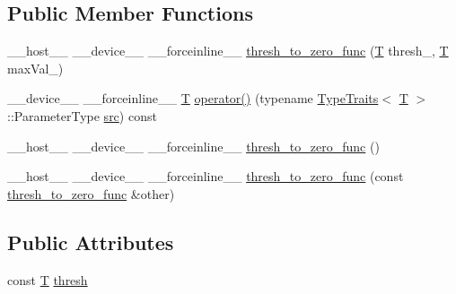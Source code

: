 \subsection*{Public Member Functions}
\begin{DoxyCompactItemize}
\item 
\-\_\-\-\_\-host\-\_\-\-\_\- \-\_\-\-\_\-device\-\_\-\-\_\- \-\_\-\-\_\-forceinline\-\_\-\-\_\- \hyperlink{structcv_1_1gpu_1_1device_1_1thresh__to__zero__func_aba225cc12669790c436d10f9c2ae39e4}{thresh\-\_\-to\-\_\-zero\-\_\-func} (\hyperlink{calib3d_8hpp_a3efb9551a871ddd0463079a808916717}{T} thresh\-\_\-, \hyperlink{calib3d_8hpp_a3efb9551a871ddd0463079a808916717}{T} max\-Val\-\_)
\item 
\-\_\-\-\_\-device\-\_\-\-\_\- \-\_\-\-\_\-forceinline\-\_\-\-\_\- \hyperlink{calib3d_8hpp_a3efb9551a871ddd0463079a808916717}{T} \hyperlink{structcv_1_1gpu_1_1device_1_1thresh__to__zero__func_a1f7f3bb5c1ef287751888031e6d613cd}{operator()} (typename \hyperlink{structcv_1_1gpu_1_1device_1_1TypeTraits}{Type\-Traits}$<$ \hyperlink{calib3d_8hpp_a3efb9551a871ddd0463079a808916717}{T} $>$\-::Parameter\-Type \hyperlink{legacy_8hpp_a371cd109b74033bc4366f584edd3dacc}{src}) const 
\item 
\-\_\-\-\_\-host\-\_\-\-\_\- \-\_\-\-\_\-device\-\_\-\-\_\- \-\_\-\-\_\-forceinline\-\_\-\-\_\- \hyperlink{structcv_1_1gpu_1_1device_1_1thresh__to__zero__func_a2d887b0ebbe6e8bef21b8d1977050ea3}{thresh\-\_\-to\-\_\-zero\-\_\-func} ()
\item 
\-\_\-\-\_\-host\-\_\-\-\_\- \-\_\-\-\_\-device\-\_\-\-\_\- \-\_\-\-\_\-forceinline\-\_\-\-\_\- \hyperlink{structcv_1_1gpu_1_1device_1_1thresh__to__zero__func_a9f28c0de5230f1ecc34449f59f51f3af}{thresh\-\_\-to\-\_\-zero\-\_\-func} (const \hyperlink{structcv_1_1gpu_1_1device_1_1thresh__to__zero__func}{thresh\-\_\-to\-\_\-zero\-\_\-func} \&other)
\end{DoxyCompactItemize}
\subsection*{Public Attributes}
\begin{DoxyCompactItemize}
\item 
const \hyperlink{calib3d_8hpp_a3efb9551a871ddd0463079a808916717}{T} \hyperlink{structcv_1_1gpu_1_1device_1_1thresh__to__zero__func_a1ccd5870cd4cb9157ec4ef2efab2c7b8}{thresh}
\end{DoxyCompactItemize}


